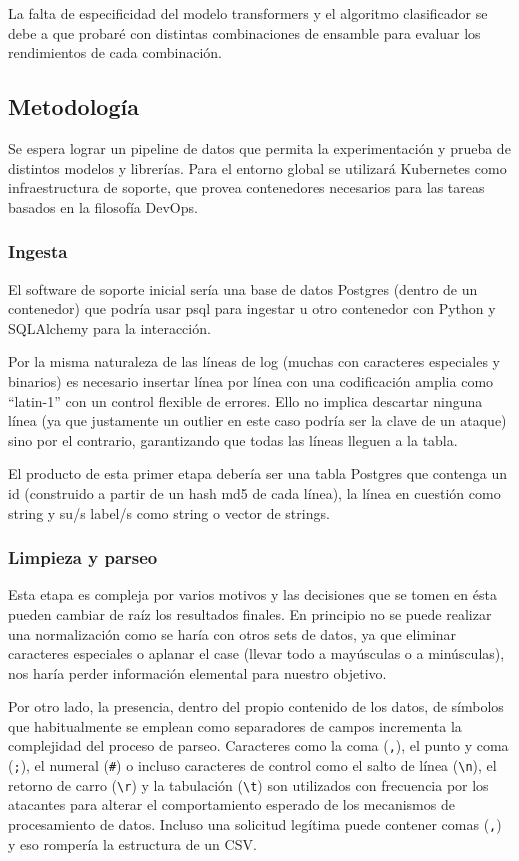 \documentclass[12pt, a4paper]{article}
\begin{document}
La falta de especificidad del modelo transformers y el algoritmo clasificador se debe a que probaré con distintas combinaciones de ensamble para evaluar los rendimientos de cada combinación.

\subsection{Metodología}
\label{sec:metodologia}

Se espera lograr un pipeline de datos que permita la experimentación y prueba de distintos modelos y librerías. Para el entorno global se utilizará Kubernetes como infraestructura de soporte, que provea contenedores necesarios para las tareas basados en la filosofía DevOps. 

\subsubsection{Ingesta}
El software de soporte inicial sería una base de datos Postgres (dentro de un contenedor) que podría usar psql para ingestar u otro contenedor con Python y SQLAlchemy para la interacción.

Por la misma naturaleza de las líneas de log (muchas con caracteres especiales y binarios) es necesario insertar línea por línea con una codificación amplia como \enquote{latin-1} con un control flexible de errores. Ello no implica descartar ninguna línea (ya que justamente un outlier en este caso podría ser la clave de un ataque) sino por el contrario, garantizando que todas las líneas lleguen a la tabla.

El producto de esta primer etapa debería ser una tabla Postgres que contenga un id (construido a partir de un hash md5 de cada línea), la línea en cuestión como string y su/s label/s como string o vector de strings.


\subsubsection{Limpieza y parseo}
Esta etapa es compleja por varios motivos y las decisiones que se tomen en ésta pueden cambiar de raíz los resultados finales. En principio no se puede realizar una normalización como se haría con otros sets de datos, ya que eliminar caracteres especiales o aplanar el case (llevar todo a mayúsculas o a minúsculas), nos haría perder información elemental para nuestro objetivo.

Por otro lado, la presencia, dentro del propio contenido de los datos, de símbolos que habitualmente se emplean como separadores de campos incrementa la complejidad del proceso de parseo. Caracteres como la coma (\texttt{,}), el punto y coma (\texttt{;}), el numeral (\texttt{\#}) o incluso caracteres de control como el salto de línea (\texttt{\textbackslash n}), el retorno de carro (\texttt{\textbackslash r}) y la tabulación (\texttt{\textbackslash t}) son utilizados con frecuencia por los atacantes para alterar el comportamiento esperado de los mecanismos de procesamiento de datos. Incluso una solicitud legítima puede contener comas (\texttt{,}) y eso rompería la estructura de un CSV.
\end{document}
